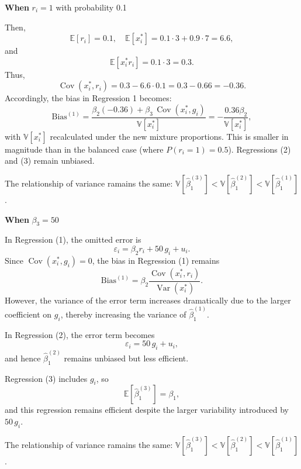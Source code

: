 \documentclass[a4paper,12pt]{article} %
\theoremstyle{nonitalic}
\newenvironment{solution}[1]
  {\renewcommand\theinnercustomsol{#1}\innercustomsol}
  {\endinnercustomsol}
\newcounter{solutionctr}
\renewcommand{\thesolutionctr}{(\alph{solutionctr})}
\newenvironment{autosolution}
  {\stepcounter{solutionctr}\begin{solution}{\thesolutionctr}}
  {\end{solution}}
\begin{document}
\begin{autosolution}
\textbf{When} $r_i = 1$ with probability 0.1

Then,
\[
\mathbb{E}[r_i]=0.1,\quad \mathbb{E}[x_i^*]=0.1\cdot 3+0.9\cdot 7=6.6,
\]
and
\[
\mathbb{E}[x_i^*r_i]=0.1\cdot 3=0.3.
\]
Thus,
\[
\operatorname{Cov}(x_i^*,r_i)=0.3-6.6\cdot 0.1=0.3-0.66=-0.36.
\]
Accordingly, the bias in Regression 1 becomes:
\[
\text{Bias}^{(1)}=\frac{\beta_2(-0.36)+\beta_3\,\operatorname{Cov}(x_i^*,g_i)}{\mathbb{V}[x_i^*]} = -\frac{0.36 \beta_2}{\mathbb{V}[x_i^*]},
\]
with $\mathbb{V}[x_i^*]$ recalculated under the new mixture proportions. 
This is smaller in magnitude than in the balanced case (where $P(r_i=1)=0.5$). 
Regressions (2) and (3) remain unbiased.

The relationship of variance ramains the same: $\mathbb{V}[\hat{\beta}_1^{(3)}] < \mathbb{V}[\hat{\beta}_1^{(2)}] < \mathbb{V}[\hat{\beta}_1^{(1)}]$.


\textbf{When} $\beta_3 = 50$

In Regression (1), the omitted error is
\[
\varepsilon_i = \beta_2 r_i + 50\,g_i + u_i.
\]
Since $\operatorname{Cov}(x^*_i,g_i)=0$, the bias in Regression (1) remains
\[
\text{Bias}^{(1)} = \beta_2 \frac{\operatorname{Cov}(x^*_i, r_i)}{\operatorname{Var}(x^*_i)}.
\]
However, the variance of the error term increases dramatically due to the larger coefficient on $g_i$, 
thereby increasing the variance of $\hat{\beta}_1^{(1)}$. 

In Regression (2), the error term becomes
\[
\varepsilon_i = 50\,g_i + u_i,
\]
and hence $\hat{\beta}_1^{(2)}$ remains unbiased but less efficient. 

Regression (3) includes $g_i$, so
\[
\mathbb{E}[\hat{\beta}_1^{(3)}] = \beta_1,
\]
and this regression remains efficient despite the larger variability introduced by $50\,g_i$.

The relationship of variance ramains the same: $\mathbb{V}[\hat{\beta}_1^{(3)}] < \mathbb{V}[\hat{\beta}_1^{(2)}] < \mathbb{V}[\hat{\beta}_1^{(1)}]$.


\end{autosolution}
\end{document}
